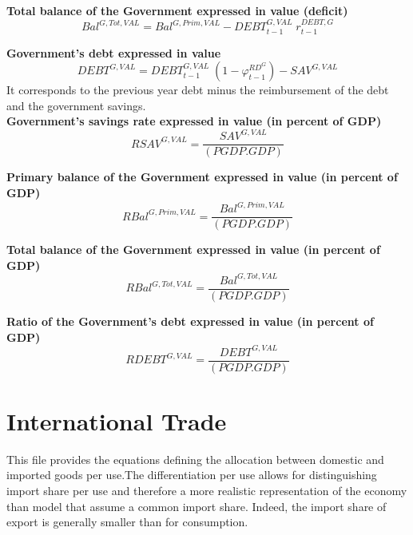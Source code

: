 \documentclass[12pt]{article}
\numberwithin{equation}{section}
\begin{document}
\noindent \textbf{Total balance of the Government expressed in value (deficit)} 
\begin{dmath}
Bal^{G,Tot,VAL} = Bal^{G,Prim,VAL} - DEBT^{G,VAL}_{t-1} \; r^{DEBT,G}_{t-1}
\label{government.mdlBal_G_Tot_VAL}
\end{dmath}

\noindent \textbf{Government's debt expressed in value} 
\begin{dmath}
DEBT^{G,VAL} = DEBT^{G,VAL}_{t-1} \; \left( 1 - \varphi^{RD^{G}}_{t-1} \right) - SAV^{G,VAL}
\label{government.mdlDEBT_G_VAL}
\end{dmath}
It corresponds to the previous year debt minus the reimbursement of the debt and the government savings. \\

\noindent \textbf{Government's savings rate expressed in value (in percent of GDP)} 
\begin{dmath}
RSAV^{G,VAL} = \frac{SAV^{G,VAL}}{\left( PGDP . GDP \right)}
\label{government.mdlRSAV_G_VAL}
\end{dmath}

\noindent \textbf{Primary balance of the Government expressed in value (in percent of GDP)} 
\begin{dmath}
RBal^{G,Prim,VAL} = \frac{Bal^{G,Prim,VAL}}{\left( PGDP . GDP \right)}
\label{government.mdlRBal_G_Prim_VAL}
\end{dmath}

\noindent \textbf{Total balance of the Government expressed in value (in percent of GDP)} 
\begin{dmath}
RBal^{G,Tot,VAL} = \frac{Bal^{G,Tot,VAL}}{\left( PGDP . GDP \right)}
\label{government.mdlRBal_G_Tot_VAL}
\end{dmath}

\noindent \textbf{Ratio of the Government's debt expressed in value (in percent of GDP)} 
\begin{dmath}
RDEBT^{G,VAL} = \frac{DEBT^{G,VAL}}{\left( PGDP . GDP \right)}
\label{government.mdlRDEBT_G_VAL}
\end{dmath}



\section{International Trade}


This file provides the equations defining the allocation between domestic and imported goods per use.The differentiation per use allows for distinguishing import share per use and therefore a more realistic representation of the economy than model that assume a common import share. Indeed, the import share of export is generally smaller than for consumption.
\end{document}
